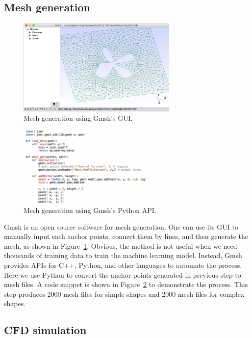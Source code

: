 \documentclass[12pt]{article}
\begin{document}
\subsection{Mesh generation}

\begin{figure}[htp]
 \centering
 \includegraphics[width=0.7\textwidth]{gmsh.png}
 \caption{Mesh generation using Gmsh's GUI.}
 \label{fig:gmsh}
\end{figure}

\begin{figure}[htp]
 \centering
 \includegraphics[width=0.6\textwidth]{gmsh-auto.png}
 \caption{Mesh generation using Gmsh's Python API.}
 \label{fig:gmsh-script}
\end{figure}

Gmsh is an open source software for mesh generation. One can use its GUI to 
manually input each anchor points, connect them by lines, and then generate the 
mesh, as shown in Figure~\ref{fig:gmsh}. Obvious, the method is not useful when 
we need thousands of training data to train the machine learning model. 
Instead, Gmsh provides APIs for C++, Python, and other languages to automate 
the process. Here we use Python to convert the anchor points generated in 
previous step to mesh files. A code snippet is shown in 
Figure~\ref{fig:gmsh-script} to demonstrate the process. This step produces 
2000 mesh files for simple shapes and 2000 mesh files for complex shapes.

\subsection{CFD simulation}
\end{document}
